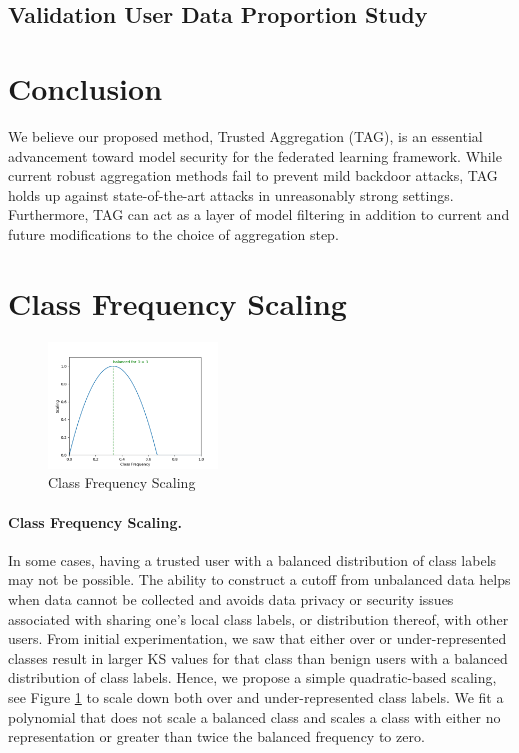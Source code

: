 \documentclass{article} %
\begin{document}
%
\subsection{Validation User Data Proportion Study}


% 
\section{Conclusion}

We believe our proposed method, Trusted Aggregation (TAG), is an essential advancement toward model security for the federated learning framework. While current robust aggregation methods fail to prevent mild backdoor attacks, TAG holds up against state-of-the-art attacks in unreasonably strong settings. Furthermore, TAG can act as a layer of model filtering in addition to current and future modifications to the choice of aggregation step.

\newpage
{  \small 


}


%
\pagebreak
\appendix

%
\section{Class Frequency Scaling}

\begin{figure}
    \centering
    \includegraphics[width=0.4\textwidth]{make_article/make_visuals/visuals/scaling.png}
    \caption{Class Frequency Scaling}
    \label{fig: scaling}
\end{figure}

\paragraph{Class Frequency Scaling.} In some cases, having a trusted user with a balanced distribution of class labels may not be possible. The ability to construct a cutoff from unbalanced data helps when data cannot be collected and avoids data privacy or security issues associated with sharing one's local class labels, or distribution thereof, with other users. From initial experimentation, we saw that either over or under-represented classes result in larger KS values for that class than benign users with a balanced distribution of class labels. Hence, we propose a simple quadratic-based scaling, see Figure \ref{fig: scaling} to scale down both over and under-represented class labels. We fit a polynomial that does not scale a balanced class and scales a class with either no representation or greater than twice the balanced frequency to zero.
\end{document}
